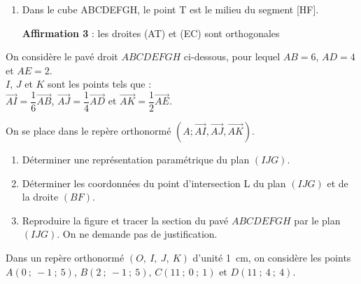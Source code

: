 \documentclass{cornouaille}
\begin{document}
\begin{colonne*exercice}
\begin{exercice}
\begin{enumerate}
                                      \item Dans le cube ABCDEFGH, le
                                        point T est le milieu du
                                        segment [HF].


                                        \begin{center}
                                          
                                        \end{center}
                                        \textbf{Affirmation 3} : les
                                        droites (AT) et (EC) sont
                                        orthogonales

                                      \end{enumerate}
                                    \end{exercice}

%

\begin{exercice}
  On considère le pavé droit $ABCDEFGH$ ci-dessous, pour lequel
  $AB = 6$, $AD = 4$ et $AE = 2$.\\
  $I$, $J$ et $K$ sont les points tels que :\\
  $\overrightarrow{AI} = \dfrac{1}{6} \overrightarrow{AB}$,
  $ \overrightarrow{AJ} = \dfrac{1}{4} \overrightarrow{AD}$ et
  $ \overrightarrow{AK} = \dfrac{1}{2} \overrightarrow {AE}$.

  \begin{center}
    
  \end{center}

On se place dans le repère orthonormé $(A;\vec{AI},\vec{AJ},\vec{AK})$.
\begin{enumerate}
\item Déterminer une représentation paramétrique du plan $(IJG)$.
\item Déterminer les coordonnées du point d'intersection L du plan
  $(IJG)$ et de la droite $(BF)$.
\item Reproduire la figure et tracer la section du pavé $ABCDEFGH$ par
  le plan $(IJG)$. On ne demande pas de justification.
\end{enumerate}
\end{exercice}

\begin{exercice}
  Dans un repère orthonormé $(O,~I,~J,~K)$ d'unité 1~cm, on considère
  les points $A(0~;~-1~;~5)$, $B(2~;~-1~;~5)$, $C(11~;~0~;~1)$ et
  $D(11~;~4~;~4)$.


\end{exercice}
\end{colonne*exercice}
\end{document}

